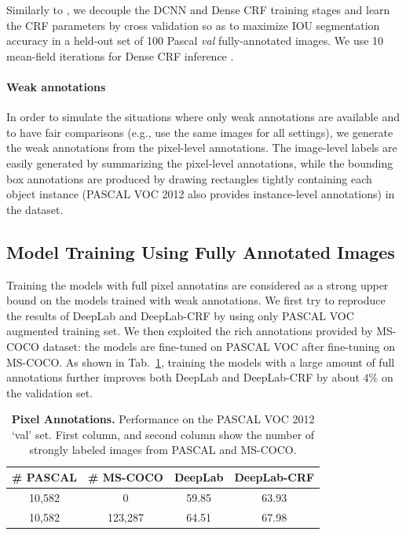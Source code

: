 Similarly to \citet{chen2014semantic}, we decouple the DCNN and Dense
CRF training stages and learn the CRF parameters by cross validation
so as to maximize IOU segmentation accuracy in a held-out set of 100
Pascal \textsl{val} fully-annotated images. We use 10 mean-field
iterations for Dense CRF inference \citep{krahenbuhl2011efficient}.

\paragraph{Weak annotations}

In order to simulate the situations where only weak annotations are
available and to have fair comparisons (e.g., use the same images for
all settings), we generate the weak annotations from the pixel-level
annotations. The image-level labels are easily generated by
summarizing the pixel-level annotations, while the bounding box
annotations are produced by drawing rectangles tightly containing each
object instance (PASCAL VOC 2012 also provides instance-level
annotations) in the dataset.

\subsection{Model Training Using Fully Annotated Images}
\label{sec:test_pixel}

Training the models with full pixel annotatins are considered as a
strong upper bound on the models trained with weak annotations. We
first try to reproduce the results of DeepLab and DeepLab-CRF
\citep{chen2014semantic} by using only PASCAL VOC augmented training
set. We then exploited the rich annotations provided by MS-COCO
dataset: the models are fine-tuned on PASCAL VOC after fine-tuning on
MS-COCO. As shown in Tab.~\ref{tb:pixel_annot}, training the models
with a large amount of full annotations further improves both DeepLab
and DeepLab-CRF by about $4\%$ on the validation set.

\begin{table}
  \centering
  \caption{{\bf{Pixel Annotations.}} Performance on the PASCAL VOC 2012 `val' set. First column, and second column show the number of strongly labeled images from PASCAL and MS-COCO. }
  \begin{tabular}{| c | c | c | c |}
    \hline
    \# PASCAL & \# MS-COCO & DeepLab & DeepLab-CRF \\
    \hline
    10,582 &   0     & 59.85 & 63.93  \\
    \hline
    10,582 & 123,287 & 64.51 & 67.98 \\
    \hline
    \end{tabular}
  \label{tb:pixel_annot}
\end{table}

